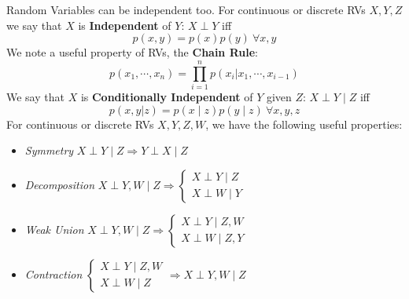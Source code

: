 \documentclass[]{article}
\theoremstyle{mattstyle}
\theoremstyle{definition}
\begin{document}
Random Variables can be independent too. For continuous or discrete RVs $X,Y, Z$ we say that $X$ is \textbf{Independent} of $Y$: $X \perp Y$ iff
$$ p(x,y) = p(x)p(y) \ \forall x,y$$
We note a useful property of RVs, the \textbf{Chain Rule}:
$$p(x_1, \cdots, x_n) = \prod_{i=1}^{n}p(x_i|x_1, \cdots, x_{i-1})$$
We say that $X$ is \textbf{Conditionally Independent} of $Y$ given $Z$: $X 	\perp Y \mid Z$ iff 
$$p(x,y|z) = p(x \mid z)p(y \mid z) \ \forall x,y,z$$
For continuous or discrete RVs $X,Y,Z,W$, we have the following useful properties:

\begin{itemize}
	\item \emph{Symmetry} $X \perp Y \mid Z \Rightarrow Y \perp X \mid Z$ 
	\item  \emph{Decomposition} $X \perp Y,W \mid Z \Rightarrow 
	\begin{cases}
	X \perp Y \mid Z \\
	X \perp W \mid Y
	\end{cases}$ 
	\item \emph{Weak Union} $X \perp Y,W \mid Z \Rightarrow 	
	\begin{cases}
	X \perp Y \mid Z, W \\
	X \perp W \mid Z, Y
	\end{cases}$ 
	\item \emph{Contraction} $\begin{cases}
	X \perp Y \mid Z,W \\
	X \perp W \mid Z
	\end{cases}
	\Rightarrow X \perp Y, W \mid Z
	$ 
\end{itemize}
\end{document}
